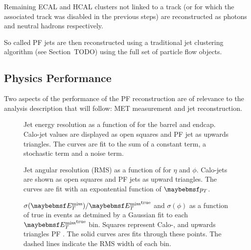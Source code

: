 Remaining \ac{ECAL} and \ac{HCAL} clusters not linked to a track (or for which
the associated track was disabled in the previous steps) are reconstructed as
photons and neutral hadrons respectively.

So called \ac{PF} jets are then reconstructed using a traditional jet clustering
algorithm (see Section~TODO) using the full set of particle flow objects.

\subsection{Physics Performance}
Two aspects of the performance of the \ac{PF} reconstruction are of relevance to
the analysis description that will follow: \acl{MET} measurement and jet
reconstruction.


\begin{figure}
\centering
{}\quad
{}\quad
\caption[]{Jet energy resolution as a function of \Pt for the
   barrel and
   endcap. Calo-jet values are
  displayed as open squares and \ac{PF} jet as upwards triangles. The curves are
  fit to the sum of a constant term, a stochastic term and a noise term.}
\label{fig:reco_pf_jet_energyres}
\end{figure}

\begin{figure}
\centering
{}\quad
{}\quad
\caption[]{Jet angular resolution (\ac{RMS}) as a function of \Pt for
   $\eta$ and 
  $\phi$. Calo-jets are shown as open squares and \ac{PF} jets as upward
  triangles. The curves are fit with an expontential function of $\Pt$.}
\label{fig:reco_pf_jet_angulares}
\end{figure}

\begin{figure}
\centering
{}\quad
{}\quad
\caption[]{$\sigma(\MET)/\MET^{\textrm{true}}$ and
   $\sigma(\phi)$ as a function of true \MET in
  \ttbar events as detmined by a Gaussian fit to each $\MET^{\textrm{true}}$
  bin. Squares represent Calo-\MET, and upwards triangles \ac{PF} \MET. The
  solid curves ares fits through these points. The dashed lines indicate the
  \ac{RMS} width of each bin.}
 \label{fig:reco_pf_met_res}
\end{figure}

